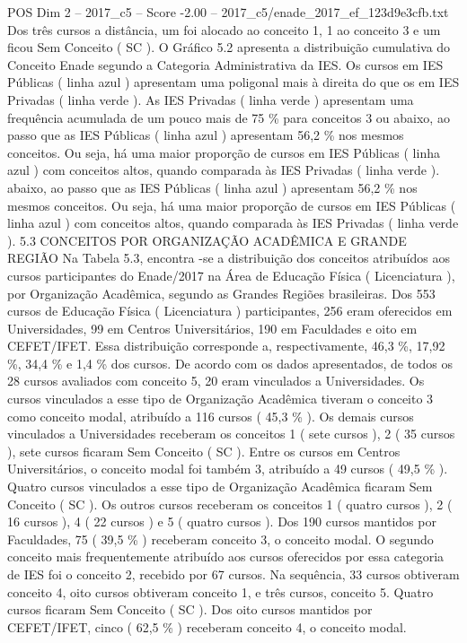 \begin{textsample}{POS Dim 2 – 2017\_c5 – Score -2.00 – 2017\_c5/enade\_2017\_ef\_123d9e3cfb.txt}
Dos três cursos a distância, um foi alocado ao conceito 1, 1 ao conceito 3 e um ficou Sem Conceito ( SC ).
O Gráfico 5.2 apresenta a distribuição cumulativa do Conceito Enade segundo a Categoria Administrativa da IES.
Os cursos em IES Públicas ( linha azul ) apresentam uma poligonal mais à direita do que os em IES Privadas ( linha verde ).
As IES Privadas ( linha verde ) apresentam uma frequência acumulada de um pouco mais de 75 \% para conceitos 3 ou abaixo, ao passo que as IES Públicas ( linha azul ) apresentam 56,2 \% nos mesmos conceitos.
Ou seja, há uma maior proporção de cursos em IES Públicas ( linha azul ) com conceitos altos, quando comparada às IES Privadas ( linha verde ). abaixo, ao passo que as IES Públicas ( linha azul ) apresentam 56,2 \% nos mesmos conceitos.
Ou seja, há uma maior proporção de cursos em IES Públicas ( linha azul ) com conceitos altos, quando comparada às IES Privadas ( linha verde ). 5.3 CONCEITOS POR ORGANIZAÇÃO ACADÊMICA E GRANDE REGIÃO Na Tabela 5.3, encontra -se a distribuição dos conceitos atribuídos aos cursos participantes do Enade/2017 na Área de Educação Física ( Licenciatura ), por Organização Acadêmica, segundo as Grandes Regiões brasileiras.
Dos 553 cursos de Educação Física ( Licenciatura ) participantes, 256 eram oferecidos em Universidades, 99 em Centros Universitários, 190 em Faculdades e oito em CEFET/IFET.
Essa distribuição corresponde a, respectivamente, 46,3 \%, 17,92 \%, 34,4 \% e 1,4 \% dos cursos.
De acordo com os dados apresentados, de todos os 28 cursos avaliados com conceito 5, 20 eram vinculados a Universidades.
Os cursos vinculados a esse tipo de Organização Acadêmica tiveram o conceito 3 como conceito modal, atribuído a 116 cursos ( 45,3 \% ).
Os demais cursos vinculados a Universidades receberam os conceitos 1 ( sete cursos ), 2 ( 35 cursos ), sete cursos ficaram Sem Conceito ( SC ).
Entre os cursos em Centros Universitários, o conceito modal foi também 3, atribuído a 49 cursos ( 49,5 \% ).
Quatro cursos vinculados a esse tipo de Organização Acadêmica ficaram Sem Conceito ( SC ).
Os outros cursos receberam os conceitos 1 ( quatro cursos ), 2 ( 16 cursos ), 4 ( 22 cursos ) e 5 ( quatro cursos ).
Dos 190 cursos mantidos por Faculdades, 75 ( 39,5 \% ) receberam conceito 3, o conceito modal.
O segundo conceito mais frequentemente atribuído aos cursos oferecidos por essa categoria de IES foi o conceito 2, recebido por 67 cursos.
Na sequência, 33 cursos obtiveram conceito 4, oito cursos obtiveram conceito 1, e três cursos, conceito 5.
Quatro cursos ficaram Sem Conceito ( SC ).
Dos oito cursos mantidos por CEFET/IFET, cinco ( 62,5 \% ) receberam conceito 4, o conceito modal.

\end{textsample}
